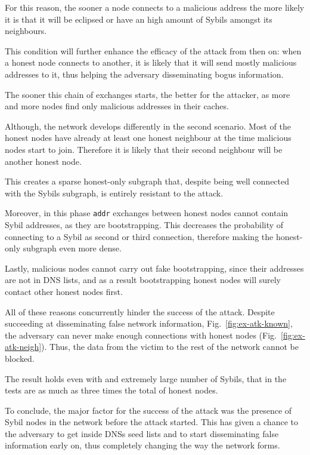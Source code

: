 For this reason, the sooner a node connects to a malicious address the more likely it is that it will be eclipsed or have an high amount of Sybils amongst its neighbours.

This condition will further enhance the efficacy of the attack from then on: when a honest node connects to another, it is likely that it will send mostly malicious addresses to it, thus helping the adversary disseminating bogus information.

The sooner this chain of exchanges starts, the better for the attacker, as more and more nodes find only malicious addresses in their caches.

Although, the network develops differently in the second scenario. Most of the honest nodes have already at least one honest neighbour at the time malicious nodes start to join. Therefore it is likely that their second neighbour will be another honest node.

This creates a sparse honest-only subgraph that, despite being well connected with the Sybils subgraph, is entirely resistant to the attack.

Moreover, in this phase \texttt{addr} exchanges between honest nodes cannot contain Sybil addresses, as they are bootstrapping. This decreases the probability of connecting to a Sybil as second or third connection, therefore making the honest-only subgraph even more dense.

Lastly, malicious nodes cannot carry out fake bootstrapping, since their addresses are not in DNS lists, and as a result bootstrapping honest nodes will surely contact other honest nodes first.

All of these reasons concurrently hinder the success of the attack. Despite succeeding at disseminating false network information, Fig.~\ref{fig:ex-atk-known}, the adversary can never make enough connections with honest nodes (Fig.~\ref{fig:ex-atk-neigh}).
Thus, the data from the victim to the rest of the network cannot be blocked.

The result holds even with and extremely large number of Sybils, that in the tests are as much as three times the total of honest nodes.

To conclude, the major factor for the success of the attack was the presence of Sybil nodes in the network before the attack started. This has given a chance to the adversary to get inside DNSs seed lists and to start disseminating false information early on, thus completely changing the way the network forms.

